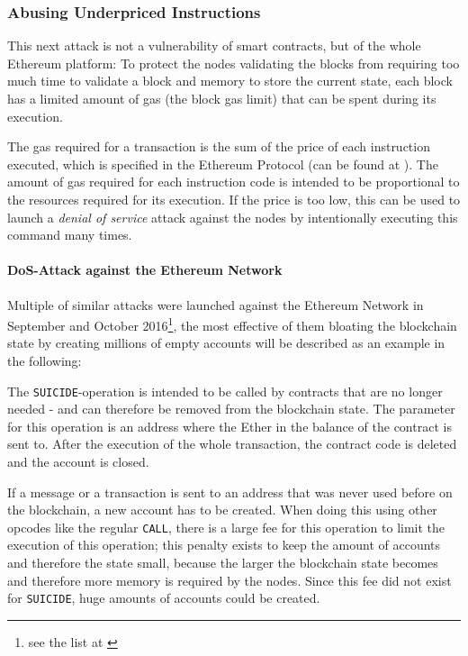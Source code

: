 \subsubsection{Abusing Underpriced Instructions}
This next attack is not a vulnerability of smart contracts, but of the whole Ethereum platform: To protect the nodes validating the blocks from requiring too much time to validate a block and memory to store the current state, each block has a limited amount of gas (the block gas limit) that can be spent during its execution.

The gas required for a transaction is the sum of the price of each instruction executed, which is specified in the Ethereum Protocol (can be found at \cite[Appendix G]{ethereum:yellowpaper}). The amount of gas required for each instruction code is intended to be proportional to the resources required for its execution. If the price is too low, this can be used to launch a \textit{denial of service} attack against the nodes by intentionally executing this command many times.

\paragraph{DoS-Attack against the Ethereum Network}
Multiple of similar attacks were launched against the Ethereum Network in September and October 2016\footnote{see the list at \cite{bokconsulting:dos}}, the most effective of them bloating the blockchain state by creating millions of empty accounts will be described as an example in the following:

The \texttt{SUICIDE}-operation is intended to be called by contracts that are no longer needed - and can therefore be removed from the blockchain state. The parameter for this operation is an address where the Ether in the balance of the contract is sent to. After the execution of the whole transaction, the contract code is deleted and the account is closed.

If a message or a transaction is sent to an address that was never used before on the blockchain, a new account has to be created. When doing this using other opcodes like the regular \texttt{CALL}, there is a large fee for this operation to limit the execution of this operation; this penalty exists to keep the amount of accounts and therefore the state small, because the larger the blockchain state becomes and therefore more memory is required by the nodes. Since this fee did not exist for \texttt{SUICIDE}, huge amounts of accounts could be created.

